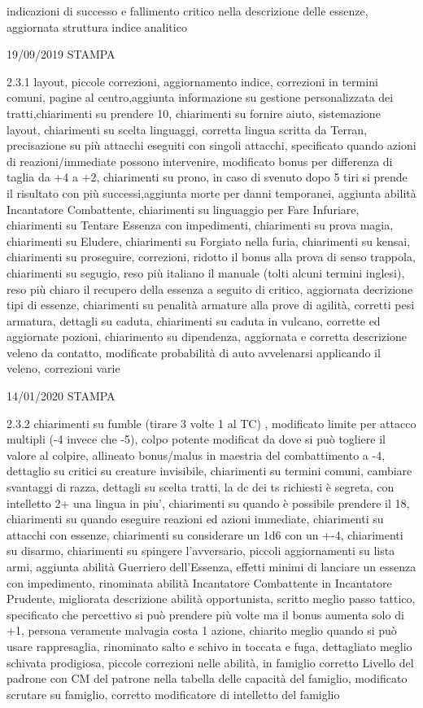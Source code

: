 \documentclass[a4paper,11pt,twoside,openany]{book}
\begin{document}
{{indicazioni di successo e fallimento critico nella descrizione delle essenze, aggiornata struttura indice analitico

	19/09/2019 STAMPA

	2.3.1 layout, piccole correzioni, aggiornamento indice, correzioni in termini comuni, pagine al centro,aggiunta informazione su gestione personalizzata dei tratti,chiarimenti su prendere 10, chiarimenti su fornire aiuto, sistemazione layout, chiarimenti su scelta linguaggi, corretta lingua scritta da Terran, precisazione su più attacchi eseguiti con singoli attacchi, specificato quando azioni di reazioni/immediate possono intervenire, modificato bonus per differenza di taglia da +4 a +2, chiarimenti su prono, in caso di svenuto dopo 5 tiri si prende il risultato con più successi,aggiunta morte per danni temporanei, aggiunta abilità Incantatore Combattente, chiarimenti su linguaggio per Fare Infuriare, chiarimenti su Tentare Essenza con impedimenti, chiarimenti su prova magia, chiarimenti su Eludere, chiarimenti su Forgiato nella furia, chiarimenti su kensai, chiarimenti su proseguire, correzioni, ridotto il bonus alla prova di senso trappola, chiarimenti su segugio, reso più italiano il manuale (tolti alcuni termini inglesi), reso più chiaro il recupero della essenza a seguito di critico, aggiornata decrizione tipi di essenze, chiarimenti su penalità armature alla prove di agilità, corretti pesi armatura, dettagli su caduta, chiarimenti su caduta in vulcano, corrette ed aggiornate pozioni, chiarimento su dipendenza, aggiornata e corretta descrizione veleno da contatto, modificate probabilità di auto avvelenarsi applicando il veleno, correzioni varie

	14/01/2020 STAMPA

	2.3.2 chiarimenti su fumble (tirare 3 volte 1 al TC) , modificato limite per attacco multipli (-4 invece che -5), colpo potente modificat da dove si può togliere il valore al colpire, allineato bonus/malus in maestria del combattimento a -4, dettaglio su critici su creature invisibile, chiarimenti su termini comuni, cambiare svantaggi di razza, dettagli su scelta tratti, la dc dei ts richiesti è segreta, con intelletto 2+ una lingua in piu', chiarimenti su quando è possibile prendere il 18, chiarimenti su quando eseguire reazioni ed azioni immediate, chiarimenti su attacchi con essenze, chiarimenti su considerare un 1d6 con un +-4, chiarimenti su disarmo, chiarimenti su spingere l'avversario, piccoli aggiornamenti su lista armi, aggiunta abilità Guerriero dell'Essenza, effetti minimi di lanciare un essenza con impedimento, rinominata abilità Incantatore Combattente in Incantatore Prudente, migliorata descrizione abilità opportunista, scritto meglio passo tattico, specificato che percettivo si può prendere più volte ma il bonus aumenta solo di +1, persona veramente malvagia costa 1 azione, chiarito meglio quando si può usare rappresaglia, rinominato salto e schivo in toccata e fuga, dettagliato meglio schivata prodigiosa, piccole correzioni nelle abilità, in famiglio corretto Livello del padrone con CM del patrone nella tabella delle capacità del famiglio, modificato scrutare su famiglio, corretto modificatore di intelletto del famiglio

}}
\end{document}
